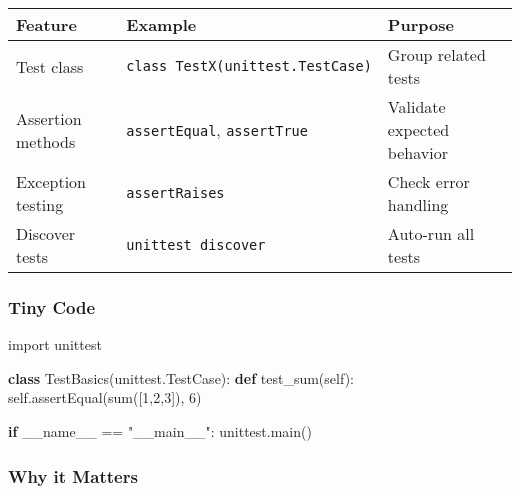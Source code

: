 \documentclass[
  letterpaper,
  DIV=11,
  numbers=noendperiod]{scrreprt}
\newenvironment{Shaded}{\begin{snugshade}}{\end{snugshade}}
\newcommand{\BuiltInTok}[1]{\textcolor[rgb]{0.00,0.23,0.31}{#1}}
\newcommand{\ControlFlowTok}[1]{\textcolor[rgb]{0.00,0.23,0.31}{\textbf{#1}}}
\newcommand{\DecValTok}[1]{\textcolor[rgb]{0.68,0.00,0.00}{#1}}
\newcommand{\ImportTok}[1]{\textcolor[rgb]{0.00,0.46,0.62}{#1}}
\newcommand{\KeywordTok}[1]{\textcolor[rgb]{0.00,0.23,0.31}{\textbf{#1}}}
\newcommand{\NormalTok}[1]{\textcolor[rgb]{0.00,0.23,0.31}{#1}}
\newcommand{\OperatorTok}[1]{\textcolor[rgb]{0.37,0.37,0.37}{#1}}
\newcommand{\StringTok}[1]{\textcolor[rgb]{0.13,0.47,0.30}{#1}}
\newcommand{\VariableTok}[1]{\textcolor[rgb]{0.07,0.07,0.07}{#1}}
\begin{document}
\begin{longtable}[]{@{}
  >{\raggedright\arraybackslash}p{}
  >{\raggedright\arraybackslash}p{}
  >{\raggedright\arraybackslash}p{}@{}}
\toprule\noalign{}
\begin{minipage}[b]{\linewidth}\raggedright
Feature
\end{minipage} & \begin{minipage}[b]{\linewidth}\raggedright
Example
\end{minipage} & \begin{minipage}[b]{\linewidth}\raggedright
Purpose
\end{minipage} \\
\midrule\noalign{}
\endhead
\bottomrule\noalign{}
\endlastfoot
Test class & \texttt{class\ TestX(unittest.TestCase)} & Group related
tests \\
Assertion methods & \texttt{assertEqual}, \texttt{assertTrue} & Validate
expected behavior \\
Exception testing & \texttt{assertRaises} & Check error handling \\
Discover tests & \texttt{unittest\ discover} & Auto-run all tests \\
\end{longtable}

\subsubsection{Tiny Code}\label{tiny-code-93}

\begin{Shaded}
\begin{Highlighting}[]
\ImportTok{import}\NormalTok{ unittest}

\KeywordTok{class}\NormalTok{ TestBasics(unittest.TestCase):}
    \KeywordTok{def}\NormalTok{ test\_sum(}\VariableTok{self}\NormalTok{):}
        \VariableTok{self}\NormalTok{.assertEqual(}\BuiltInTok{sum}\NormalTok{([}\DecValTok{1}\NormalTok{,}\DecValTok{2}\NormalTok{,}\DecValTok{3}\NormalTok{]), }\DecValTok{6}\NormalTok{)}

\ControlFlowTok{if} \VariableTok{\_\_name\_\_} \OperatorTok{==} \StringTok{"\_\_main\_\_"}\NormalTok{:}
\NormalTok{    unittest.main()}
\end{Highlighting}
\end{Shaded}

\subsubsection{Why it Matters}\label{why-it-matters-93}
\end{document}
